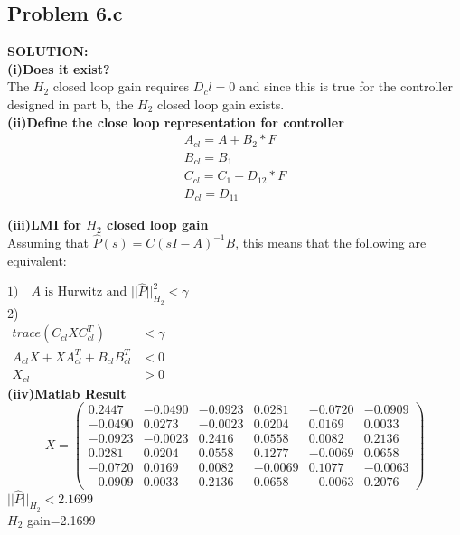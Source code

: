 \documentclass[10pt,a4paper]{article}
\begin{document}
\subsection{Problem 6.c}
\begin{tcolorbox}
\textbf{SOLUTION:}\\
\textbf{(i)Does it exist?}\\
The $H_2$ closed loop gain requires $D_cl=0$ and since this is true for the controller designed in part b, the $H_2$ closed loop gain exists.\\

\textbf{(ii)Define the close loop representation for controller}
\begin{align*}
A_{cl} = A+B_2*F\\
B_{cl} = B_1\\
C_{cl}= C_1+D_12*F\\
D_{cl} = D_11
\end{align*}

\textbf{(iii)LMI for $H_2$ closed loop gain}\\
Assuming that $\hat{P}(s)=C(sI-A)^{-1}B$, this means that the following are equivalent:

$ 1)\quad A\text{ is Hurwitz and }||\hat{P}||^2_{H_2}<\gamma$\\

2)\\
$\begin{matrix}
trace(C_{cl}XC_{cl}^T )&<\gamma\\
A_{cl}X+XA_{cl}^T +B_{cl}B_{cl}^T &<0\\
X_{cl}&>0
\end{matrix}$\\

\textbf{(iiv)Matlab Result}\\
$$X=\left(\begin{array}{cccccc} 0.2447 & -0.0490 & -0.0923 & 0.0281 & -0.0720 & -0.0909\\ -0.0490 & 0.0273 & -0.0023 & 0.0204 & 0.0169 & 0.0033\\ -0.0923 & -0.0023 & 0.2416 & 0.0558 & 0.0082 & 0.2136\\ 0.0281 & 0.0204 & 0.0558 & 0.1277 & -0.0069 & 0.0658\\ -0.0720 & 0.0169 & 0.0082 & -0.0069 & 0.1077 & -0.0063\\ -0.0909 & 0.0033 & 0.2136 & 0.0658 & -0.0063 & 0.2076 \end{array}\right)
$$
$||\hat{P}||_{H_{2}} < 2.1699$  \\  
$H_2$ gain=2.1699

\end{tcolorbox}
\end{document}
